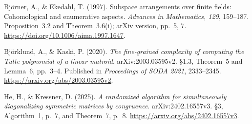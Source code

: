 Bj\"orner, A., \& Ekedahl, T. (1997). Subspace arrangements over finite fields: Cohomological and enumerative aspects. \emph{Advances in Mathematics, 129}, 159--187. Proposition~3.2 and Theorem~3.6(i); arXiv version, pp.~5, 7. \url{https://doi.org/10.1006/aima.1997.1647}.

Bj\"orklund, A., \& Kaski, P. (2020). \emph{The fine-grained complexity of computing the Tutte polynomial of a linear matroid}. arXiv:2003.03595v2. \S1.3, Theorem~5 and Lemma~6, pp.~3--4. Published in \emph{Proceedings of SODA 2021}, 2333--2345. \url{https://arxiv.org/abs/2003.03595v2}.

He, H., \& Kressner, D. (2025). \emph{A randomized algorithm for simultaneously diagonalizing symmetric matrices by congruence}. arXiv:2402.16557v3. \S3, Algorithm~1, p.~7, and Theorem~7, p.~8. \url{https://arxiv.org/abs/2402.16557v3}.
